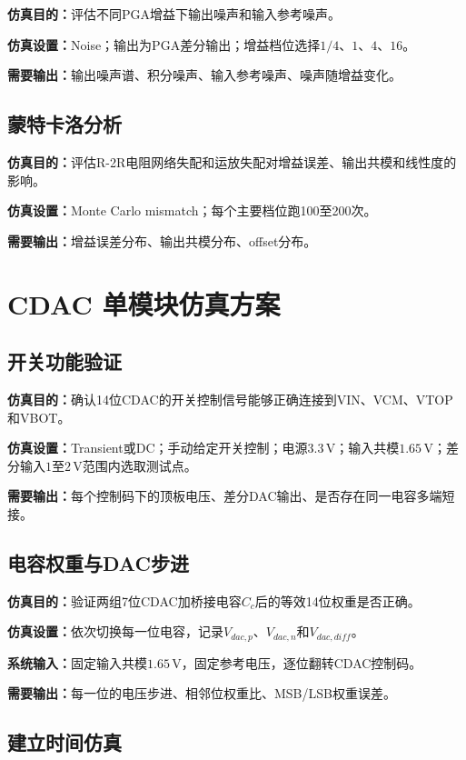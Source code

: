 \documentclass[12pt,a4paper]{ctexart}
\begin{document}
\textbf{仿真目的：}评估不同PGA增益下输出噪声和输入参考噪声。

\textbf{仿真设置：}Noise；输出为PGA差分输出；增益档位选择$1/4$、$1$、$4$、$16$。

\textbf{需要输出：}输出噪声谱、积分噪声、输入参考噪声、噪声随增益变化。

\subsection{蒙特卡洛分析}

\textbf{仿真目的：}评估R-2R电阻网络失配和运放失配对增益误差、输出共模和线性度的影响。

\textbf{仿真设置：}Monte Carlo mismatch；每个主要档位跑100至200次。

\textbf{需要输出：}增益误差分布、输出共模分布、offset分布。

\section{CDAC 单模块仿真方案}

\subsection{开关功能验证}

\textbf{仿真目的：}确认14位CDAC的开关控制信号能够正确连接到VIN、VCM、VTOP和VBOT。

\textbf{仿真设置：}Transient或DC；手动给定开关控制；电源$3.3\,\mathrm{V}$；输入共模$1.65\,\mathrm{V}$；差分输入$1$至$2\,\mathrm{V}$范围内选取测试点。

\textbf{需要输出：}每个控制码下的顶板电压、差分DAC输出、是否存在同一电容多端短接。

\subsection{电容权重与DAC步进}

\textbf{仿真目的：}验证两组7位CDAC加桥接电容$C_c$后的等效14位权重是否正确。

\textbf{仿真设置：}依次切换每一位电容，记录$V_{dac,p}$、$V_{dac,n}$和$V_{dac,diff}$。

\textbf{系统输入：}固定输入共模$1.65\,\mathrm{V}$，固定参考电压，逐位翻转CDAC控制码。

\textbf{需要输出：}每一位的电压步进、相邻位权重比、MSB/LSB权重误差。

\subsection{建立时间仿真}
\end{document}
